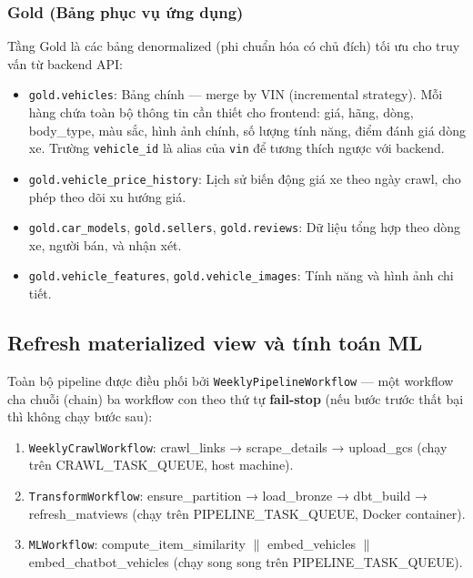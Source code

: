 \subsubsection{Gold (Bảng phục vụ ứng dụng)}

Tầng Gold là các bảng denormalized (phi chuẩn hóa có chủ đích) tối ưu cho truy vấn từ backend API:

\begin{itemize}
    \item \texttt{gold.vehicles}: Bảng chính — merge by VIN (incremental strategy). Mỗi hàng chứa toàn bộ thông tin cần thiết cho frontend: giá, hãng, dòng, body\_type, màu sắc, hình ảnh chính, số lượng tính năng, điểm đánh giá dòng xe. Trường \texttt{vehicle\_id} là alias của \texttt{vin} để tương thích ngược với backend.
    \item \texttt{gold.vehicle\_price\_history}: Lịch sử biến động giá xe theo ngày crawl, cho phép theo dõi xu hướng giá.
    \item \texttt{gold.car\_models}, \texttt{gold.sellers}, \texttt{gold.reviews}: Dữ liệu tổng hợp theo dòng xe, người bán, và nhận xét.
    \item \texttt{gold.vehicle\_features}, \texttt{gold.vehicle\_images}: Tính năng và hình ảnh chi tiết.
\end{itemize}

\subsection{Refresh materialized view và tính toán ML}

Toàn bộ pipeline được điều phối bởi \texttt{WeeklyPipelineWorkflow} — một workflow cha chuỗi (chain) ba workflow con theo thứ tự \textbf{fail-stop} (nếu bước trước thất bại thì không chạy bước sau):

\begin{enumerate}
    \item \texttt{WeeklyCrawlWorkflow}: crawl\_links → scrape\_details → upload\_gcs (chạy trên CRAWL\_TASK\_QUEUE, host machine).
    \item \texttt{TransformWorkflow}: ensure\_partition → load\_bronze → dbt\_build → refresh\_matviews (chạy trên PIPELINE\_TASK\_QUEUE, Docker container).
    \item \texttt{MLWorkflow}: compute\_item\_similarity $\parallel$ embed\_vehicles $\parallel$ embed\_chatbot\_vehicles (chạy song song trên PIPELINE\_TASK\_QUEUE).
\end{enumerate}

